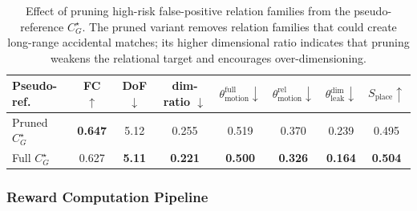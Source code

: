 \begin{table}[t]
    \centering
    \footnotesize
    \setlength{\tabcolsep}{1pt}
    \caption{Effect of pruning high-risk false-positive relation families from the pseudo-reference $C_G^\star$. The pruned variant removes relation families that could create long-range accidental matches; its higher dimensional ratio indicates that pruning weakens the relational target and encourages over-dimensioning.}
    \label{tab:appendix_pseudo_ambiguous}
    \begin{tabularx}{\linewidth}{@{}lccccccc@{}}
        \toprule
        Pseudo-ref. & FC $\uparrow$ & DoF $\downarrow$ & dim-ratio $\downarrow$ & $\theta_{\mathrm{motion}}^{\mathrm{full}}\!\downarrow$ & $\theta_{\mathrm{motion}}^{\mathrm{rel}}\!\downarrow$ & $\theta_{\mathrm{leak}}^{\mathrm{dim}}\!\downarrow$ & $S_{\mathrm{place}}\!\uparrow$\\
        \midrule
        Pruned $C_G^\star$ & \textbf{0.647} & 5.12 & 0.255 & 0.519 & 0.370 & 0.239 & 0.495 \\
        Full $C_G^\star$ & 0.627 & \textbf{5.11} & \textbf{0.221} & \textbf{0.500} & \textbf{0.326} & \textbf{0.164} & \textbf{0.504} \\
        \bottomrule
    \end{tabularx}
\end{table}

\subsubsection{Reward Computation Pipeline}
\label{sec:appendix_rl_online_metric}

